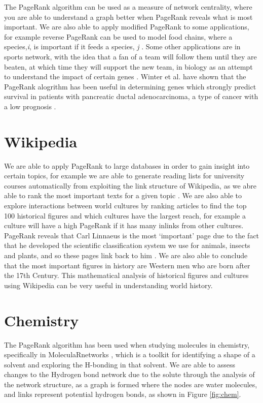 \documentclass[11pt]{report}
\begin{document}
The PageRank algorithm can be used as a measure of network centrality, where you are able to understand a graph better when PageRank reveals what is most important. We are also able to apply modified PageRank to some applications, for example reverse PageRank can be used to model food chains, where a species,\textit{i}, is important if it feeds a species, \textit{j} \cite{allesina2009googling}. Some other applications are in sports network, with the idea that a fan of a team will follow them until they are beaten, at which time they will support the new team, in biology as an attempt to understand the impact of certain genes \cite{gleich2015pagerank}. Winter et al. have shown that the PageRank alogrithm has been useful in determining genes which strongly predict survival in patients with pancreatic ductal adenocarcinoma, a type of cancer with a low prognosis \cite{winter2012google}.

\section{Wikipedia} \label{sec:wiki}
We are able to apply PageRank to large databases in order to gain insight into certain topics, for example we are able to generate reading lists for university courses automatically from exploiting the link structure of Wikipedia, as we abre able to rank the most important texts for a given topic \cite{wissner2006preparation}. We are also able to explore interactions between world cultures by ranking articles to find the top 100 historical figures and which cultures have the largest reach, for example a culture will have a high PageRank if it has many inlinks from other cultures. PageRank reveals that Carl Linnaeus is the most `important' page due to the fact that he developed the scientific classification system we use for animals, insects and plants, and so these pages link back to him \cite{eom2015interactions}. We are also able to conclude that the most important figures in history are Western men who are born after the 17th Century. This mathematical analysis of historical figures and cultures using Wikipedia can be very useful in understanding world history.

\section{Chemistry} \label{sec:chem}
The PageRank algorithm has been used when studying molecules in chemistry, specifically in MoleculaRnetworks \cite{JCC:JCC22917}, which is a toolkit for identifying a shape of a solvent and exploring the H-bonding in that solvent. We are able to assess changes to the Hydrogen bond network due to the solute through the analysis of the network structure, as a graph is formed where the nodes are water molecules, and links represent potential hydrogen bonds, as shown in Figure \ref{fig:chem}. 
\end{document}

